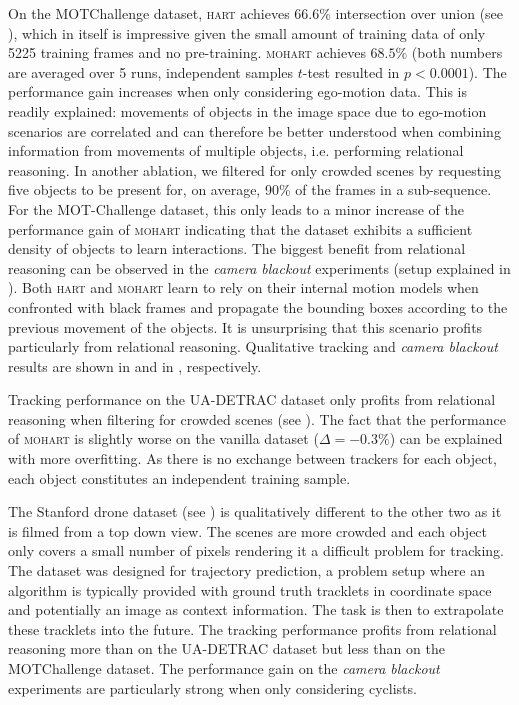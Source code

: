 On the MOTChallenge dataset, \textsc{hart} achieves $66.6\%$ intersection over union (see ), which in itself is impressive given the small amount of training data of only 5225 training frames and no pre-training. \textsc{mohart} achieves $68.5\%$ (both numbers are averaged over 5 runs, independent samples $t$-test resulted in $p < 0.0001$). The performance gain increases when only considering ego-motion data. This is readily explained: movements of objects in the image space due to ego-motion scenarios are correlated and can therefore be better understood when combining information from movements of multiple objects, i.e. performing relational reasoning. In another ablation, we filtered for only crowded scenes by requesting five objects to be present for, on average, 90\% of the frames in a sub-sequence. For the MOT-Challenge dataset, this only leads to a minor increase of the performance gain of \textsc{mohart} indicating that the dataset exhibits a sufficient density of objects to learn interactions. The biggest benefit from relational reasoning can be observed in the \textit{camera blackout} experiments (setup explained in ). Both \textsc{hart} and \textsc{mohart} learn to rely on their internal motion models when confronted with black frames and propagate the bounding boxes according to the previous movement of the objects. It is unsurprising that this scenario profits particularly from relational reasoning. Qualitative tracking and \textit{camera blackout} results are shown in  and in , respectively.

Tracking performance on the UA-DETRAC dataset only profits from relational reasoning when filtering for crowded scenes (see ). The fact that the performance of \textsc{mohart} is slightly worse on the vanilla dataset ($\Delta = -0.3\%$) can be explained with more overfitting. As there is no exchange between trackers for each object, each object constitutes an independent training sample.

The Stanford drone dataset (see ) is qualitatively different to the other two as it is filmed from a top down view. The scenes are more crowded and each object only covers a small number of pixels rendering it a difficult problem for tracking. The dataset was designed for trajectory prediction, a problem setup where an algorithm is typically provided with ground truth tracklets in coordinate space and potentially an image as context information. The task is then to extrapolate these tracklets into the future. The tracking performance profits from relational reasoning more than on the UA-DETRAC dataset but less than on the MOTChallenge dataset. The performance gain on the \textit{camera blackout} experiments are particularly strong when only considering cyclists. 


